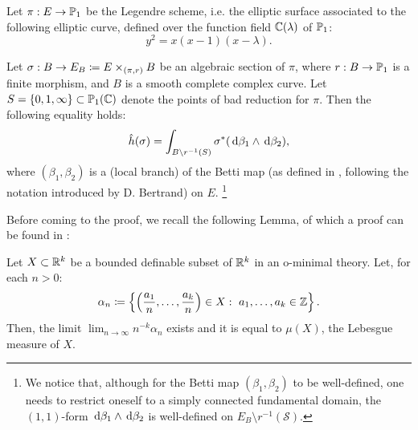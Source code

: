 \documentclass[a4paper,12pt]{article}
\begin{document}
Let $\pi:E \rightarrow \P_1$ be the Legendre scheme, i.e. the elliptic surface associated to the following elliptic curve, defined over the function field $\C(\lambda)$ of $\P_1$:
\[
y^2=x(x-1)(x-\lambda).
\]

\begin{theorem}\label{Prop:equality}
	Let $\sigma:B \rightarrow E_B \defeq E\times_{(\pi,r)}B$ be an algebraic section of $\pi$, where $r:B \rightarrow \P_1$ is a finite morphism, and $B$ is a smooth complete complex curve. Let $S=\{0,1,\infty\} \subset \P_1(\C)$ denote the points of bad reduction for $\pi$. Then the following equality holds:
	\begin{equation}\label{soughtequality}
	\hat{h}(\sigma) = \int_{B \setminus r^{-1}(S)} \sigma^*(\de \beta_1 \wedge \de \beta_2),
	\end{equation}
	where $(\beta_1,\beta_2)$ is a (local branch) of the Betti map (as defined in \cite[Section 1.1]{bettitorsion}, following the notation introduced by D. Bertrand) on $E$. \footnote{We notice that, although for the Betti map $(\beta_1,\beta_2)$ to be well-defined, one needs to restrict oneself to a simply connected fundamental domain, the $(1,1)$-form $\de \beta_1 \wedge \de \beta_2$ is well-defined on $E_B \setminus r^{-1}(\mathcal{S})$.}
\end{theorem}

Before coming to the proof, we recall the following Lemma, of which a proof can be found in \cite{ominimal}:
\begin{lemma}\label{ominimalmeasure}
	Let $X \subset \R^k$ be a bounded definable subset of $\R^k$ in an o-minimal theory. Let, for each $n>0$:
	\[
	\alpha_n \defeq \left\{\left(\frac{a_1}{n},\dots,\frac{a_k}{n} \right)\in X: \ a_1,\dots, a_k \in \Z \right\}.
	\]
	Then, the limit $\lim_{n \to \infty} n^{-k}\alpha_n$ exists and it is equal to $\mu(X)$, the Lebesgue measure of $X$.
\end{lemma}
\end{document}
